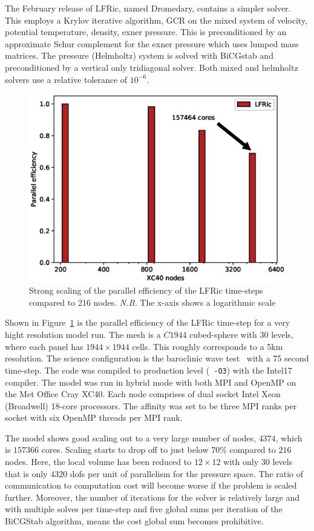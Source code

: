 \documentclass[review,times]{elsarticle}
\begin{document}
The February release of LFRic, named Dromedary, contains a simpler
solver. This employs a Krylov iterative algorithm, GCR on the mixed
system of velocity, potential temperature, density, exner
pressure. This is preconditioned by an approximate Schur complement
for the exner pressure which uses lumped mass matrices. The pressure
(Helmholtz) system is solved with BiCGstab and preconditioned by a
vertical only tridiagonal solver. Both mixed and helmholtz solvers use
a relative tolerance of $10^{-6}$.

\begin{figure}
  \begin{center}
    \includegraphics[width=0.85\linewidth]{scale.eps}
    \caption{\label{fig:scale_PE}Strong scaling of the parallel efficiency of the LFRic 
      time-steps compared to 216 nodes. {\em N.B.} The x-axis shows a
      logarithmic scale}
  \end{center}
\end{figure}

Shown in Figure~\ref{fig:scale_PE} is 
the parallel efficiency of the LFRic time-step for a very hight 
resolution model run. The mesh is a $C1944$ cubed-sphere with 30 
levels, where each panel has $1944 \times 1944$ cells. This roughly corresponds 
to a 5km resolution. The science configuration is the baroclinic wave 
test~\cite{qj.2241} with a 75 second time-step. The code was compiled 
to production level (\verb+ -O3+) with the Intel17 compiler. The model 
was run in hybrid mode with both MPI and OpenMP on the Met Office Cray 
XC40. Each node comprises of dual socket Intel Xeon (Broadwell) 
18-core processors. The affinity was set to be three MPI ranks per 
socket with six OpenMP threads per MPI rank. 

The model shows good scaling out to a very large number of nodes,
$4374$, which is $157366$ cores. Scaling starts to drop off to
just below $70\%$ compared to $216$ nodes. Here, the local volume has
been reduced to $12\times 12$ with only $30$ levels that is only
$4320$ dofs per unit of parallelism for the pressure space. The ratio
of communication to computation cost will become worse if the problem
is scaled further. Moreover, the number of
iterations for the solver is relatively large and with multiple solves
per time-step and five global sums per iteration of the BiCGStab
algorithm, means the cost global sum becomes prohibitive. 
\end{document}
